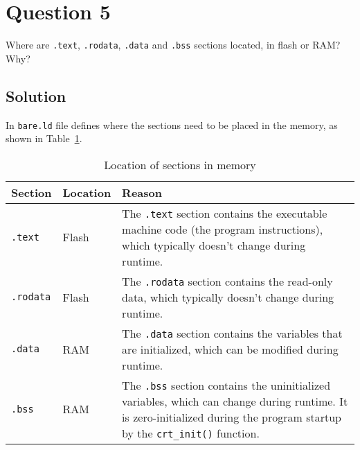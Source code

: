 \section*{Question 5}

Where are \texttt{.text}, \texttt{.rodata}, \texttt{.data} and \texttt{.bss} sections located, in flash or RAM?\@
Why?

\subsection*{Solution}

In \texttt{bare.ld} file defines where the sections need to be placed in the memory, as shown in Table~\ref{tab:sections}.
\begin{table}[h]
    \centering
    \begin{tabular}{p{2cm} p{2cm} p{10cm}} \toprule
        \textbf{Section}  &
        \textbf{Location} &
        \textbf{Reason}
        \\ \midrule
        \texttt{.text}    &
        Flash             &
        The \texttt{.text} section contains the executable machine code (the program instructions), which typically doesn't change during runtime.
        \\
        \texttt{.rodata}  &
        Flash             &
        The \texttt{.rodata} section contains the read-only data, which typically doesn't change during runtime.
        \\
        \texttt{.data}    &
        RAM               &
        The \texttt{.data} section contains the variables that are initialized, which can be modified during runtime.
        \\
        \texttt{.bss}     &
        RAM               &
        The \texttt{.bss} section contains the uninitialized variables, which can change during runtime.
        It is zero-initialized during the program startup by the \texttt{crt\_init\@()} function.
        \\ \bottomrule
    \end{tabular}
    \caption{
        Location of sections in memory
    }\label{tab:sections}
\end{table}
